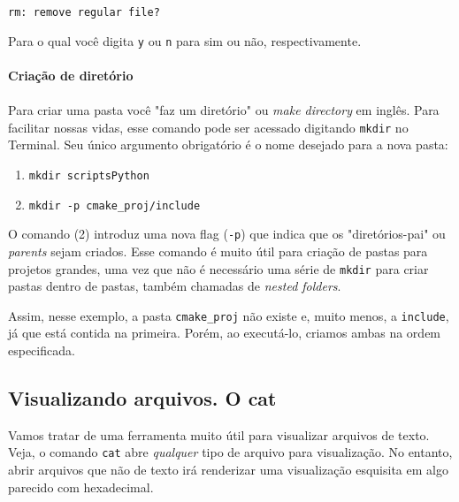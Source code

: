 \documentclass{article}
\begin{document}
	\vspace{1ex}
	\texttt{rm: remove regular file?} 
	\vspace{1ex} 

	Para o qual você digita \texttt{y} ou \texttt{n} para sim ou não, respectivamente. 

	\paragraph{Criação de diretório} 
	\paragraph{}

	Para criar uma pasta você "faz um diretório" ou \textit{make directory} em inglês. Para facilitar nossas vidas, esse 
	comando pode ser acessado digitando \texttt{mkdir} no Terminal. Seu único argumento obrigatório é o nome desejado para a nova pasta:

	\begin{enumerate}
	 	\item{\texttt{mkdir scriptsPython}}
	 	\item{\texttt{mkdir -p cmake\_proj/include}}
	\end{enumerate}

	O comando (2) introduz uma nova flag (\texttt{-p}) que indica que os "diretórios-pai" ou \textit{parents} sejam criados. 
	Esse comando é muito útil para criação de pastas para projetos grandes, uma vez que não é necessário uma série de \texttt{mkdir}
	para criar pastas dentro de pastas, também chamadas de \textit{nested folders}.

	Assim, nesse exemplo, a pasta \texttt{cmake\_proj} não existe e, muito menos, a \texttt{include}, já que está contida na primeira. 
	Porém, ao executá-lo, criamos ambas na ordem especificada.

	\subsection{Visualizando arquivos. O cat} 

	Vamos tratar de uma ferramenta muito útil para visualizar arquivos de texto. Veja, o comando \texttt{cat} abre 
	\textit{qualquer} tipo de arquivo para visualização. No entanto, abrir arquivos que não de texto irá renderizar 
	uma visualização esquisita em algo parecido com hexadecimal.
\end{document}

